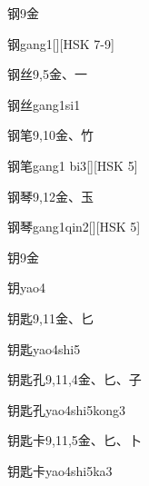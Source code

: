 \begin{Entry}{钢}{9}{⾦}
  \begin{Phonetics}{钢}{gang1}[][HSK 7-9]
  \end{Phonetics}
\end{Entry}

\begin{Entry}{钢丝}{9,5}{⾦、⼀}
  \begin{Phonetics}{钢丝}{gang1si1}
  \end{Phonetics}
\end{Entry}

\begin{Entry}{钢笔}{9,10}{⾦、⽵}
  \begin{Phonetics}{钢笔}{gang1 bi3}[][HSK 5]
  \end{Phonetics}
\end{Entry}

\begin{Entry}{钢琴}{9,12}{⾦、⽟}
  \begin{Phonetics}{钢琴}{gang1qin2}[][HSK 5]
  \end{Phonetics}
\end{Entry}

\begin{Entry}{钥}{9}{⾦}
  \begin{Phonetics}{钥}{yao4}
  \end{Phonetics}
\end{Entry}

\begin{Entry}{钥匙}{9,11}{⾦、⼔}
  \begin{Phonetics}{钥匙}{yao4shi5}
  \end{Phonetics}
\end{Entry}

\begin{Entry}{钥匙孔}{9,11,4}{⾦、⼔、⼦}
  \begin{Phonetics}{钥匙孔}{yao4shi5kong3}
  \end{Phonetics}
\end{Entry}

\begin{Entry}{钥匙卡}{9,11,5}{⾦、⼔、⼘}
  \begin{Phonetics}{钥匙卡}{yao4shi5ka3}
  \end{Phonetics}
\end{Entry}

